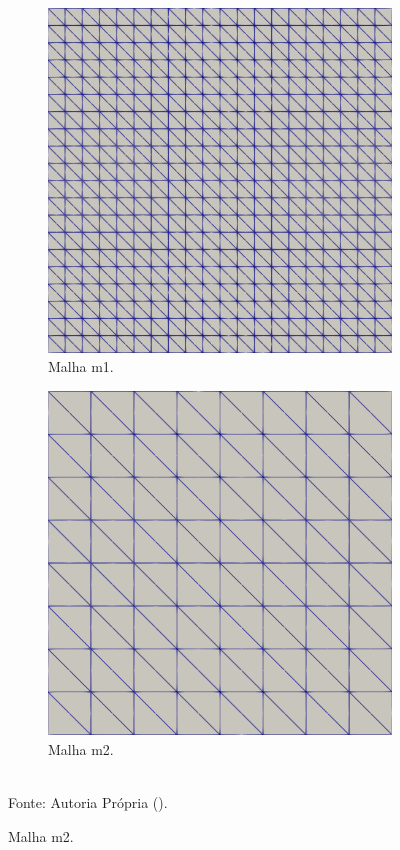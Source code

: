 \begin{figure}[h!]
    \centering
    \caption{Cavidade bidimensional - Malhas utilizadas para a análise de convergência.}
    \begin{subfigure}{0.49\textwidth}
        \centering
        \includegraphics[width=0.8\linewidth]{Figuras/Cavity/m2.png}
        \caption{Malha m1.}
    \end{subfigure}
    \begin{subfigure}{0.49\textwidth}
        \centering
        \includegraphics[width=0.8\linewidth]{Figuras/Cavity/m3.png}
        \caption{Malha m2.}
    \end{subfigure}
    \\Fonte: Autoria Própria (\the\year).
    \label{fig:cavity-mesh2}
\end{figure}

